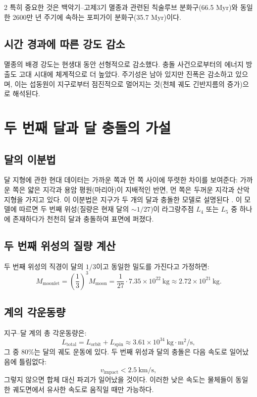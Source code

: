 \documentclass[12pt,a4paper]{article}
\begin{document}
\begin{multicols}{2}
		특히 중요한 것은 백악기–고제3기 멸종과 관련된 칙술루브 분화구(66.5 Myr)와 동일한 2600만 년 주기에 속하는 포피가이 분화구(35.7 Myr)이다.
		
		\subsection{시간 경과에 따른 강도 감소}
		멸종의 배경 강도는 현생대 동안 선형적으로 감소했다. 충돌 사건으로부터의 에너지 방출도 고대 시대에 체계적으로 더 높았다. 주기성은 남아 있지만 진폭은 감소하고 있으며, 이는 섭동원이 지구로부터 점진적으로 멀어지는 것(천체 궤도 긴반지름의 증가)으로 해석된다.
		
		\section{두 번째 달과 달 충돌의 가설}
		\subsection{달의 이분법}
		달 지형에 관한 현대 데이터는 가까운 쪽과 먼 쪽 사이에 뚜렷한 차이를 보여준다: 가까운 쪽은 얇은 지각과 용암 평원(마리아)이 지배적인 반면, 먼 쪽은 두꺼운 지각과 산악 지형을 가지고 있다. 이 이분법은 지구가 두 개의 달과 충돌한 모델로 설명된다 \cite{JutziAsphaug2011}. 이 모델에 따르면 두 번째 위성(질량은 현재 달의 \(\sim 1/27\))이 라그랑주점 \(L_4\) 또는 \(L_5\) 중 하나에 존재하다가 천천히 달과 충돌하여 표면에 퍼졌다.
		
		\subsection{두 번째 위성의 질량 계산}
		두 번째 위성의 직경이 달의 \(1/3\)이고 동일한 밀도를 가진다고 가정하면:
		{\small
			\[
			M_{\text{moonlet}} = \left(\frac{1}{3}\right)^3 M_{\text{moon}} = \frac{1}{27} \cdot 7.35 \times 10^{22}\ \text{kg} \approx 2.72 \times 10^{21}\ \text{kg}.
			\]}
		
		\subsection{계의 각운동량}
		지구–달 계의 총 각운동량은:
		\[
		L_{\text{total}} = L_{\text{orbit}} + L_{\text{spin}} \approx 3.61 \times 10^{34}\ \text{kg}\cdot\text{m}^2/\text{s},
		\]
		그 중 80\%는 달의 궤도 운동에 있다. 두 번째 위성과 달의 충돌은 다음 속도로 일어났음에 틀림없다:
		\[
		v_{\text{impact}} < 2.5\ \text{km/s},
		\]
		그렇지 않으면 합체 대신 파괴가 일어났을 것이다. 이러한 낮은 속도는 물체들이 동일한 궤도면에서 유사한 속도로 움직일 때만 가능하다.
		

\end{multicols}
\end{document}
